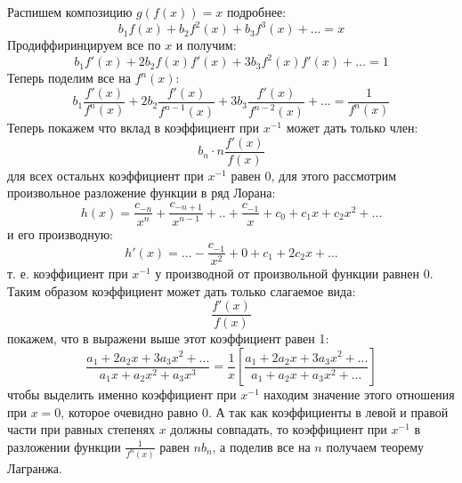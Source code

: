 Распишем композицию $g\left(f\left(x\right)\right) = x$ подробнее:
\[
	b_1 f\left(x\right) + b_2 f^2\left(x\right) + b_3 f^3\left(x\right) + ... = x
\]
Продиффиринцируем все по $x$ и получим:
\[
	b_1 f'\left(x\right) + 2b_2 f\left(x\right)f'\left(x\right) + 3b_3f^2\left(x\right)f'\left(x\right) + ... = 1
\]
Теперь поделим все на $f^n\left(x\right)$:
\[
	b_1\frac{f'\left(x\right)}{f^n\left(x\right)} + 2b_2\frac{f'\left(x\right)}{f^{n-1}\left(x\right)} + 3b_3\frac{f'\left(x\right)}{f^{n-2}\left(x\right)} + ... = \frac{1}{f^n\left(x\right)}
\]
Теперь покажем что вклад в коэффициент при $x^{-1}$ может дать только член:
\[
	b_n \cdot n \frac{f'\left(x\right)}{f\left(x\right)}
\]
для всех остальнх коэффициент при $x^{-1}$ равен 0, для этого рассмотрим произвольное разложение функции в ряд Лорана:
\[
	h\left(x\right) = \frac{c_{-n}}{x^n} + \frac{c_{-n+1}}{x^{n-1}} + .. + \frac{c_{-1}}{x} + c_0 + c_1 x + c_2 x^2 + ...
\]
и его производную:
\[
	h'\left(x\right) = ... - \frac{c_{-1}}{x^2} + 0 + c_1 + 2c_2x + ...
\]
т. е. коэффициент при $x^{-1}$ у производной от произвольной функции равнен 0. Таким образом коэффициент может дать только слагаемое вида:
\[
	\frac{f'\left(x\right)}{f\left(x\right)}
\]
покажем, что в выражени выше этот коэффициент равен 1:
\[
	\frac{a_1 + 2 a_2 x + 3a_3 x^2 + ...}{a_1x + a_2x^2 + a_3x^3} = \frac{1}{x} \left[\frac{a_1 + 2 a_2x + 3a_3 x^2 + ...}{a_1 + a_2x + a_3 x^2 + ...}\right]
\]
чтобы выделить именно коэффициент при $x^{-1}$ находим значение этого отношения при $x = 0$, которое очевидно равно 0. А так как коэффициенты в левой и правой части при равных степенях $x$ должны совпадать, то коэффициент при $x^{-1}$ в разложении функции $\frac{1}{f^n\left(x\right)}$ равен $nb_n$, а поделив все на $n$ получаем теорему Лагранжа.
